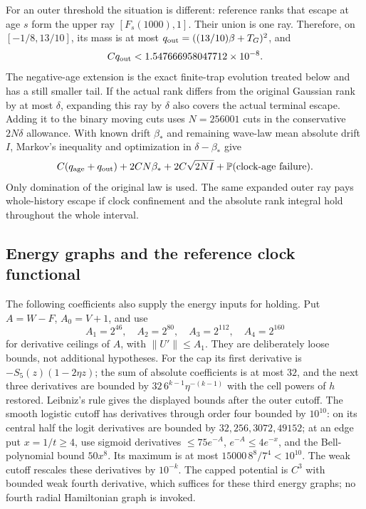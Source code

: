 \documentclass[11pt]{article}
\theoremstyle{definition}\newtheorem{definition}[theorem]{Definition}
\theoremstyle{remark}\newtheorem{remark}[theorem]{Remark}
\newcommand{\Prob}{\mathbb P}\newcommand{\E}{\mathbb E}
\begin{document}
For an outer threshold the situation is different: reference ranks that
escape at age $s$ form the upper ray $[F_s(1000),1]$. Their union is one
ray. Therefore, on $[-1/8,13/10]$, its mass is at most
$q_{\rm out}=((13/10)\beta+T_G)^2$, and
\begin{equation}
 Cq_{\rm out}<1.547666958047712\times10^{-8}.\label{old:outer}
\end{equation}
The negative-age extension is the exact finite-trap evolution treated
below and has a still smaller tail. If the actual rank differs from the
original Gaussian rank by at most $\delta$, expanding this ray by
$\delta$ also covers the actual terminal escape. Adding it to the binary
moving cuts uses $N=256001$ cuts in the conservative $2N\delta$ allowance.
With known drift $\beta_*$ and remaining wave-law mean absolute drift
$I$, Markov's inequality and optimization in $\delta-\beta_*$ give
\begin{equation}
 C(q_{\rm age}+q_{\rm out})+2CN\beta_*+2C\sqrt{2NI}
       +\Prob(\hbox{clock-age failure}).\label{old:rankbridge}
\end{equation}
Only domination of the original law is used. The same expanded outer
ray pays whole-history escape if clock confinement and the absolute
rank integral hold throughout the whole interval.

\subsection{Energy graphs and the reference clock functional}
\label{old:graphs}
The following coefficients also supply the energy inputs for holding.
Put $A=W-F$, $A_0=V+1$, and use
\[
 A_1=2^{46},\quad A_2=2^{80},\quad A_3=2^{112},\quad A_4=2^{160}
\]
for derivative ceilings of $A$, with $\|U'\|\leq A_1$.
They are deliberately loose bounds, not additional hypotheses. For the
cap its first derivative is $-S_5(z)(1-2\eta z)$; the sum of absolute
coefficients is at most $32$, and the next three derivatives are bounded
by $32\,6^{k-1}\eta^{-(k-1)}$ with the cell powers of $h$ restored.
Leibniz's rule gives the displayed bounds after the outer cutoff.
The smooth logistic cutoff has derivatives through order four bounded
by $10^{10}$: on its central half the logit derivatives are bounded by
$32,256,3072,49152$; at an edge put $x=1/t\geq4$, use sigmoid derivatives
$\leq75e^{-A}$, $e^{-A}\leq4e^{-x}$, and the Bell-polynomial bound
$50x^8$. Its maximum is at most $15000\,8^8/7^4<10^{10}$.
The weak cutoff rescales these derivatives by $10^{-k}$.
The capped potential is $C^3$ with bounded weak fourth derivative,
which suffices for these third energy graphs; no fourth radial
Hamiltonian graph is invoked.
\end{document}
